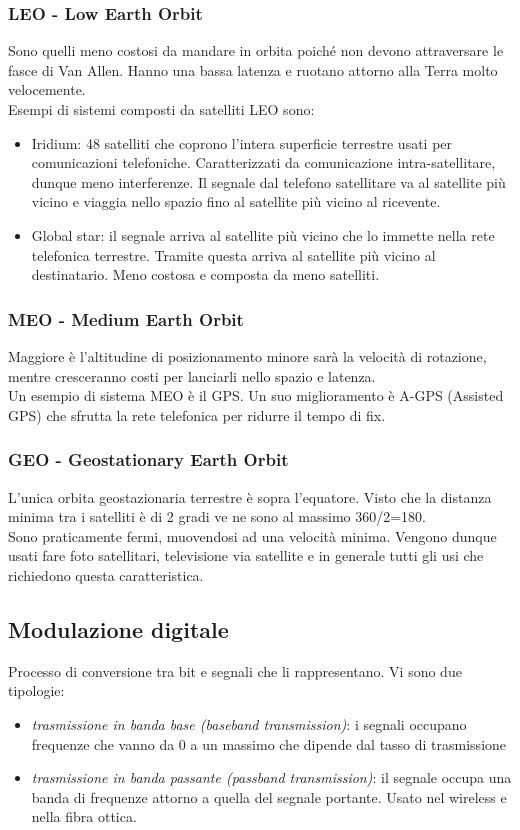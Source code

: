 \documentclass[10pt,a4paper,twoside]{article}
\begin{document}
\subsubsection{LEO - Low Earth Orbit}
Sono quelli meno costosi da mandare in orbita poiché non devono attraversare le fasce di Van Allen. Hanno una bassa latenza e ruotano attorno alla Terra molto velocemente.\\
Esempi di sistemi composti da satelliti LEO sono:
\begin{itemize}
	\item Iridium: 48 satelliti che coprono l'intera superficie terrestre usati per comunicazioni telefoniche. Caratterizzati da comunicazione intra-satellitare, dunque meno interferenze. Il segnale dal telefono satellitare va al satellite più vicino e viaggia nello spazio fino al satellite più vicino al ricevente.
	\item Global star: il segnale arriva al satellite più vicino che lo immette nella rete telefonica terrestre. Tramite questa arriva al satellite più vicino al destinatario. Meno costosa e composta da meno satelliti.
\end{itemize}

\subsubsection{MEO - Medium Earth Orbit}
Maggiore è l'altitudine di posizionamento minore sarà la velocità di rotazione, mentre cresceranno costi per lanciarli nello spazio e latenza.\\
Un esempio di sistema MEO è il GPS. Un suo miglioramento è A-GPS (Assisted GPS) che sfrutta la rete telefonica per ridurre il tempo di fix.

\subsubsection{GEO - Geostationary Earth Orbit}
L'unica orbita geostazionaria terrestre è sopra l'equatore. Visto che la distanza minima tra i satelliti è di 2 gradi ve ne sono al massimo 360/2=180.\\
Sono praticamente fermi, muovendosi ad una velocità minima. Vengono dunque usati fare foto satellitari, televisione via satellite e in generale tutti gli usi che richiedono questa caratteristica.

\subsection{Modulazione digitale}
Processo di conversione tra bit e segnali che li rappresentano.
Vi sono due tipologie:
\begin{itemize}
\item \textit{trasmissione in banda base (baseband transmission)}: i segnali occupano frequenze che vanno da 0 a un massimo che dipende dal tasso di trasmissione
\item \textit{trasmissione in banda passante (passband transmission)}: il segnale occupa una banda di frequenze attorno a quella del segnale portante. Usato nel wireless e nella fibra ottica.
\end{itemize}
\end{document}
